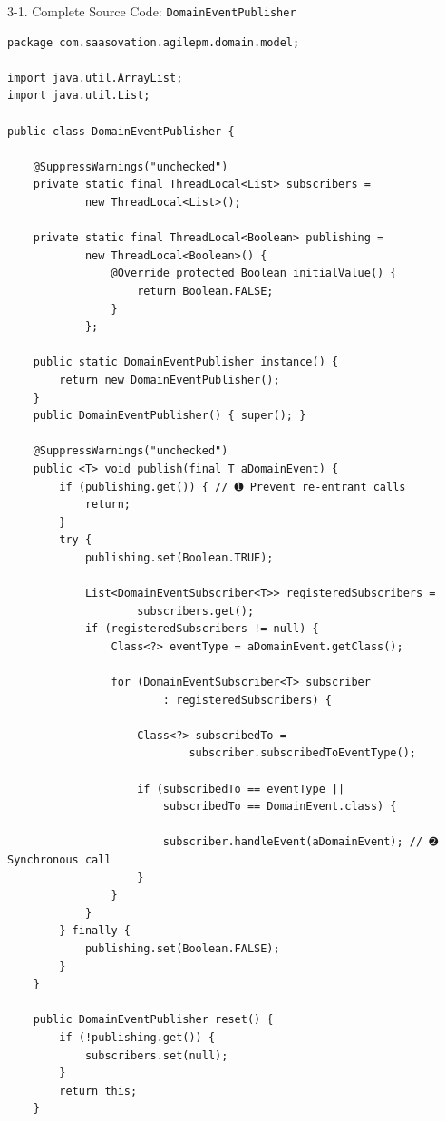 \documentclass{beamer}
\begin{document}
\begin{frame}[fragile]{3-1. Complete Source Code: \texttt{DomainEventPublisher}}
\begin{lstlisting}
package com.saasovation.agilepm.domain.model;

import java.util.ArrayList;
import java.util.List;

public class DomainEventPublisher {

    @SuppressWarnings("unchecked")
    private static final ThreadLocal<List> subscribers =
            new ThreadLocal<List>();

    private static final ThreadLocal<Boolean> publishing =
            new ThreadLocal<Boolean>() {
                @Override protected Boolean initialValue() {
                    return Boolean.FALSE;
                }
            };

    public static DomainEventPublisher instance() {
        return new DomainEventPublisher();
    }
    public DomainEventPublisher() { super(); }

    @SuppressWarnings("unchecked")
    public <T> void publish(final T aDomainEvent) {
        if (publishing.get()) { // ➊ Prevent re-entrant calls
            return;
        }
        try {
            publishing.set(Boolean.TRUE);

            List<DomainEventSubscriber<T>> registeredSubscribers =
                    subscribers.get();
            if (registeredSubscribers != null) {
                Class<?> eventType = aDomainEvent.getClass();

                for (DomainEventSubscriber<T> subscriber
                        : registeredSubscribers) {

                    Class<?> subscribedTo =
                            subscriber.subscribedToEventType();

                    if (subscribedTo == eventType ||
                        subscribedTo == DomainEvent.class) {

                        subscriber.handleEvent(aDomainEvent); // ➋ Synchronous call
                    }
                }
            }
        } finally {
            publishing.set(Boolean.FALSE);
        }
    }

    public DomainEventPublisher reset() {
        if (!publishing.get()) {
            subscribers.set(null);
        }
        return this;
    }


\end{lstlisting}
\end{frame}
\end{document}

